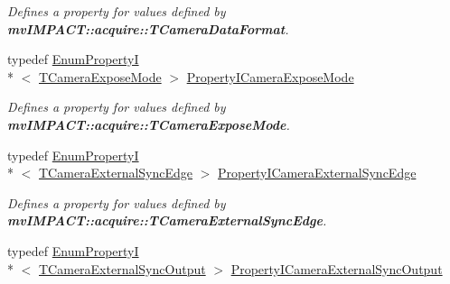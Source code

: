 \begin{DoxyCompactItemize}
\begin{DoxyCompactList}\small\item\em Defines a property for values defined by {\bfseries mv\+I\+M\+P\+A\+C\+T\+::acquire\+::\+T\+Camera\+Data\+Format}. \end{DoxyCompactList}\item 
\hypertarget{group___device_specific_interface_ga1b37c202f78d874f5a68bfd7555ea552}{typedef \hyperlink{classmv_i_m_p_a_c_t_1_1acquire_1_1_enum_property_i}{Enum\+Property\+I}\\*
$<$ \hyperlink{group___device_specific_interface_ga40926eaa36a3af4b5d380723be4024b9}{T\+Camera\+Expose\+Mode} $>$ \hyperlink{group___device_specific_interface_ga1b37c202f78d874f5a68bfd7555ea552}{Property\+I\+Camera\+Expose\+Mode}}\label{group___device_specific_interface_ga1b37c202f78d874f5a68bfd7555ea552}

\begin{DoxyCompactList}\small\item\em Defines a property for values defined by {\bfseries mv\+I\+M\+P\+A\+C\+T\+::acquire\+::\+T\+Camera\+Expose\+Mode}. \end{DoxyCompactList}\item 
\hypertarget{group___device_specific_interface_gaac63793b596b074fc5012dd82aafd035}{typedef \hyperlink{classmv_i_m_p_a_c_t_1_1acquire_1_1_enum_property_i}{Enum\+Property\+I}\\*
$<$ \hyperlink{group___device_specific_interface_gaac8409db4152f0241d58b6b88a837fbd}{T\+Camera\+External\+Sync\+Edge} $>$ \hyperlink{group___device_specific_interface_gaac63793b596b074fc5012dd82aafd035}{Property\+I\+Camera\+External\+Sync\+Edge}}\label{group___device_specific_interface_gaac63793b596b074fc5012dd82aafd035}

\begin{DoxyCompactList}\small\item\em Defines a property for values defined by {\bfseries mv\+I\+M\+P\+A\+C\+T\+::acquire\+::\+T\+Camera\+External\+Sync\+Edge}. \end{DoxyCompactList}\item 
\hypertarget{group___device_specific_interface_gaf4592fe544c7f9ad2d0b480f7f1b75b5}{typedef \hyperlink{classmv_i_m_p_a_c_t_1_1acquire_1_1_enum_property_i}{Enum\+Property\+I}\\*
$<$ \hyperlink{group___device_specific_interface_ga7e0cda0b45b6d0142d2560d276672edd}{T\+Camera\+External\+Sync\+Output} $>$ \hyperlink{group___device_specific_interface_gaf4592fe544c7f9ad2d0b480f7f1b75b5}{Property\+I\+Camera\+External\+Sync\+Output}}\label{group___device_specific_interface_gaf4592fe544c7f9ad2d0b480f7f1b75b5}


\end{DoxyCompactItemize}
